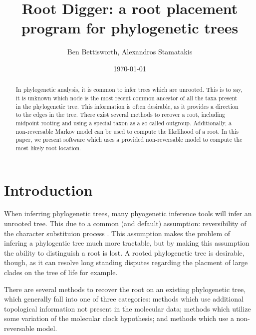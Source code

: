 \documentclass{article}
\title{Root Digger: a root placement program for phylogenetic trees}
\author{Ben Bettisworth, Alexandros Stamatakis}
\date{\today}
\begin{document}
\begin{abstract}
  In phylogenetic analysis, it is common to infer trees which are unrooted. This
  is to say, it is unknown which node is the most recent common ancestor of all
  the taxa present in the phylogenetic tree. This information is often desirable,
  as it provides a direction to the edges in the tree. There exist several
  methods to recover a root, including midpoint rooting and using a special taxon
  as a so called outgroup. Additionally, a non-reversable Markov model can be used
  to compute the likelihood of a root. In this paper, we present software which
  uses a provided non-reversable model to compute the most likely root location.
\end{abstract}

\maketitle



\section{Introduction}


When inferring phylogenetic trees, many phyogenetic inference tools
\cite{stamatakis_raxml_2014} \cite{nguyen_iq-tree:_2015} will infer an unrooted
tree. This due to a common (and default) assumption: reversibility of the
character substituion process \cite{felsenstein_evolutionary_1981}. This
assumption makes the problem of infering a phylogentic tree much more tractable,
but by making this assumption the ability to distinguish a root is lost. A
rooted phylogenetic tree is desirable, though, as it can resolve long standing
disputes regarding the placment of large clades on the tree of life
\cite{dunn_animal_2014} for example.

There are several methods to recover the root on an existing phylogenetic tree,
which generally fall into one of three categories: methods which use additional
topological information not present in the molecular data; methods which utilize
some variation of the molecular clock hypothesis; and methods which use a
non-reversable model.
\end{document}
